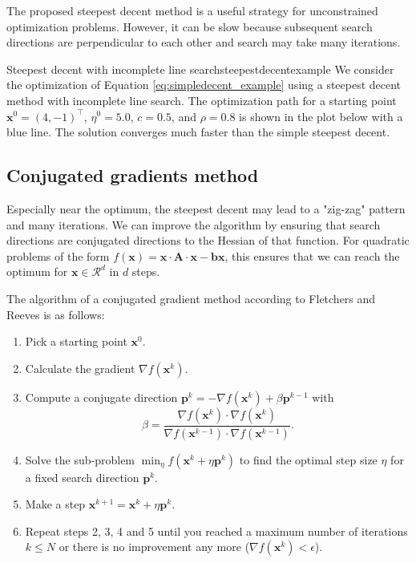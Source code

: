 The proposed steepest decent method is a useful strategy for unconstrained optimization problems. However, it can be slow because subsequent search directions are perpendicular to each other and search may take many iterations.

\begin{example}{Steepest decent with incomplete line search}{steepestdecentexample}
    We consider the optimization of Equation \eqref{eq:simpledecent_example} using a steepest decent method with incomplete line search. The optimization path for a starting point $\mathbf{x}^0= (4, -1)^\top$, $\eta^0=5.0$, $c=0.5$, and $\rho=0.8$ is shown in the plot below with a blue line. The solution converges much faster than the simple steepest decent.
    \begin{center}
        
    \end{center}   
\end{example}

\subsection{Conjugated gradients method}
Especially near the optimum, the steepest decent may lead to a "zig-zag" pattern and many iterations. We can improve the algorithm by ensuring that search directions are conjugated directions to the Hessian of that function. For quadratic problems of the form $f(\mathbf{x}) = \mathbf{x} \cdot \mathbf{A} \cdot \mathbf{x} - \mathbf{b} \mathbf{x}$, this ensures that we can reach the optimum for $\mathbf{x} \in \mathcal{R}^d$ in $d$ steps.

The algorithm of a conjugated gradient method according to Fletchers and Reeves \cite{Fletcher1964} is as follows: 
\begin{enumerate}
    \item Pick a starting point $\mathbf{x}^0$.
    \item Calculate the gradient $\nabla f(\mathbf{x}^k)$.
    \item Compute a conjugate direction $\mathbf{p}^k = -\nabla f(\mathbf{x}^k) + \beta \mathbf{p}^{k-1}$ with  
    \begin{equation}
        \beta = \frac{\nabla f(\mathbf{x}^k) \cdot \nabla f(\mathbf{x}^k)}{\nabla f(\mathbf{x}^{k-1}) \cdot \nabla f(\mathbf{x}^{k-1})}.
    \end{equation}
    \item Solve the sub-problem $\min_{\eta} f(\mathbf{x}^k + \eta \mathbf{p}^k)$ to find the optimal step size $\eta$ for a fixed search direction $\mathbf{p}^k$.
    \item Make a step $\mathbf{x}^{k+1} = \mathbf{x}^k + \eta \mathbf{p}^k$.
    \item Repeat steps 2, 3, 4 and 5 until you reached a maximum number of iterations $k \le N$ or there is no improvement any more ($ \nabla f(\mathbf{x}^k) < \epsilon$). 
\end{enumerate}


